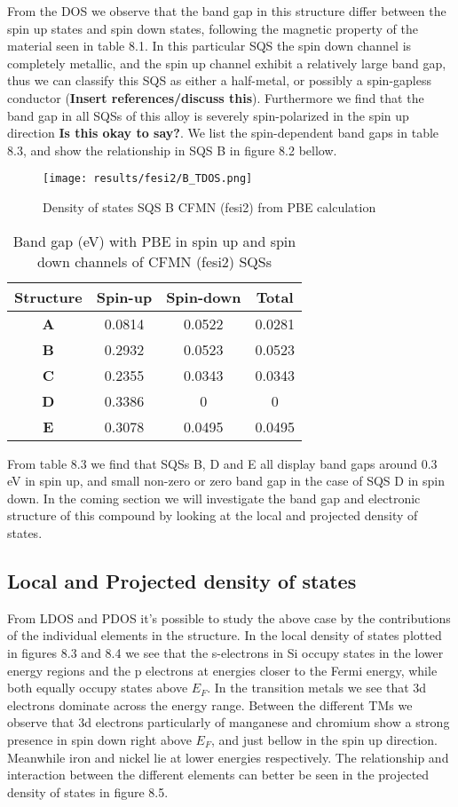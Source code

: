 From the DOS we observe that the band gap in this structure differ between the spin up states and spin down states, following the magnetic property of the material seen in table 8.1. In this particular SQS the spin down channel is completely metallic, and the spin up channel exhibit a relatively large band gap, thus we can classify this SQS as either a half-metal, or possibly a spin-gapless conductor (\textbf{Insert references/discuss this}). Furthermore we find that the band gap in all SQSs of this alloy is severely spin-polarized in the spin up direction \textbf{Is this okay to say?}. We list the spin-dependent band gaps in table 8.3, and show the relationship in SQS B in figure 8.2 bellow.

\begin{figure}[H]
	\texttt{[image: results/fesi2/B\_TDOS.png]}
	\caption{Density of states SQS B CFMN (fesi2) from PBE calculation}
\end{figure}

\begin{table}[H]
\centering
\begin{tabular}{@{}cccc@{}}
\toprule
Structure  & Spin-up & Spin-down & Total  \\ \midrule
\textbf{A} & 0.0814  & 0.0522    & 0.0281 \\
\textbf{B} & 0.2932  & 0.0523    & 0.0523 \\
\textbf{C} & 0.2355  & 0.0343    & 0.0343 \\
\textbf{D} & 0.3386  & 0         & 0      \\
\textbf{E} & 0.3078  & 0.0495    & 0.0495 \\ \bottomrule
\end{tabular}
\caption{Band gap (eV) with PBE in spin up and spin down channels of CFMN (fesi2) SQSs}
\end{table}

From table 8.3 we find that SQSs B, D and E all display band gaps around 0.3 eV in spin up, and small non-zero or zero band gap in the case of SQS D in spin down. In the coming section we will investigate the band gap and electronic structure of this compound by looking at the local and projected density of states. 

\subsection{Local and Projected density of states}
From LDOS and PDOS it's possible to study the above case by the contributions of the individual elements in the structure. In the local density of states plotted in figures 8.3 and 8.4 we see that the s-electrons in Si occupy states in the lower energy regions and the p electrons at energies closer to the Fermi energy, while both equally occupy states above $E_F$. In the transition metals we see that 3d electrons dominate across the energy range. Between the different TMs we observe that 3d electrons particularly of manganese and chromium show a strong presence in spin down right above $E_F$, and just bellow in the spin up direction. Meanwhile iron and nickel lie at lower energies respectively. The relationship and interaction between the different elements can better be seen in the projected density of states in figure 8.5. 

